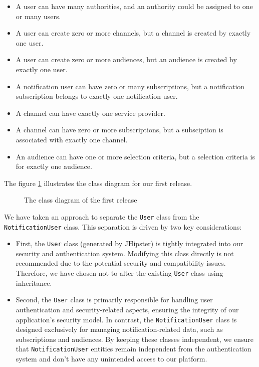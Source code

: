 \begin{itemize}
    \item A user can have many authorities, and an authority could be assigned to one or many users.
    \item A user can create zero or more channels, but a channel is created by exactly one user.
    \item A user can create zero or more audiences, but an audience is created by exactly one user.
    \item A notification user can have zero or many subscriptions, but a notification subscription
          belongs to exactly one notification user.
    \item A channel can have exactly one service provider.
    \item A channel can have zero or more subscriptions, but a subsciption is associated with exactly one channel.
    \item An audience can have one or more selection criteria, but a selection criteria is for exactly one audience.
\end{itemize}

\noindent The figure \ref{r1-class} illustrates the class diagram for our first release. \\

\begin{figure}[hbt!]
    \centering
    
    \caption{The class diagram of the first release}
    \label{r1-class}
\end{figure}

\noindent We have taken an approach to separate the \texttt{User} class from the
\texttt{NotificationUser} class. This separation is driven by two key considerations:

\begin{itemize}
    \item First, the \texttt{User} class (generated by JHipster) is tightly integrated into our
          security and authentication system. Modifying this class directly is not recommended
          due to the potential security and compatibility issues. Therefore, we have chosen not
          to alter the existing \texttt{User} class using inheritance.

    \item Second, the \texttt{User} class is primarily responsible for handling user authentication and
          security-related aspects, ensuring the integrity of our application's security model. In contrast,
          the \texttt{NotificationUser} class is designed exclusively for managing notification-related data,
          such as subscriptions and audiences. By keeping these classes independent, we ensure that
          \texttt{NotificationUser} entities remain independent from the authentication system and don't
          have any unintended access to our platform.
\end{itemize}


